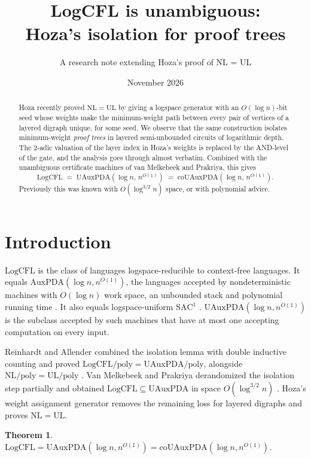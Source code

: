 \documentclass[11pt,letterpaper]{article}
\title{\bfseries LogCFL is unambiguous:\\Hoza's isolation for proof trees}
\author{A research note extending Hoza's proof of NL = UL}
\date{November 2026}
\newtheorem{theorem}{Theorem}
\theoremstyle{definition}
\theoremstyle{remark}
\newcommand{\LogCFL}{\mathrm{LogCFL}}
\newcommand{\UAux}{\mathrm{UAuxPDA}}
\begin{document}
\maketitle
\begin{abstract}
Hoza recently proved $\mathrm{NL}=\mathrm{UL}$ by giving a logspace generator
with an $O(\log n)$-bit seed whose weights make the minimum-weight path between
every pair of vertices of a layered digraph unique, for some seed. We observe
that the same construction isolates minimum-weight \emph{proof trees} in
layered semi-unbounded circuits of logarithmic depth. The 2-adic valuation of the layer
index in Hoza's weights is replaced by the AND-level of the gate, and the
analysis goes through almost verbatim. Combined with the unambiguous
certificate machines of van Melkebeek and Prakriya, this gives
\[
 \LogCFL \;=\; \UAux(\log n,\,n^{O(1)}) \;=\; \mathrm{co}\UAux(\log n,\,n^{O(1)}).
\]
Previously this was known with $O(\log^{3/2} n)$ space, or with polynomial advice.
\end{abstract}

\section{Introduction}
$\LogCFL$ is the class of languages logspace-reducible to context-free
languages. It equals $\mathrm{AuxPDA}(\log n,n^{O(1)})$, the languages accepted
by nondeterministic machines with $O(\log n)$ work space, an unbounded stack
and polynomial running time \cite{Sudborough}. It also equals
logspace-uniform $\mathrm{SAC}^1$ \cite{Venkateswaran}. $\UAux(\log
n,n^{O(1)})$ is the subclass accepted by such machines that have at most one
accepting computation on every input.

Reinhardt and Allender combined the isolation lemma with double inductive
counting and proved $\LogCFL/\mathrm{poly}=\UAux/\mathrm{poly}$, alongside
$\mathrm{NL}/\mathrm{poly}=\mathrm{UL}/\mathrm{poly}$ \cite{RA}. Van Melkebeek and Prakriya derandomized
the isolation step partially and obtained $\LogCFL\subseteq\UAux$ in space
$O(\log^{3/2}n)$ \cite{vMP}. Hoza's weight assignment generator \cite{Hoza}
removes the remaining loss for layered digraphs and proves $\mathrm{NL}=\mathrm{UL}$.

\begin{theorem}\label{thm:main}
$\LogCFL = \UAux(\log n,n^{O(1)}) = \mathrm{co}\UAux(\log n,n^{O(1)})$.
\end{theorem}
\end{document}
